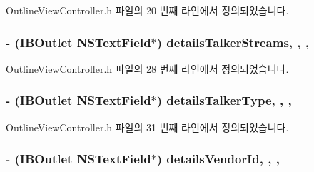 Outline\+View\+Controller.\+h 파일의 20 번째 라인에서 정의되었습니다.

\subsubsection[{\texorpdfstring{details\+Talker\+Streams}{detailsTalkerStreams}}]{\setlength{\rightskip}{0pt plus 5cm}-\/ (I\+B\+Outlet N\+S\+Text\+Field$\ast$) details\+Talker\+Streams\hspace{0.3cm}{\ttfamily [read]}, {\ttfamily [write]}, {\ttfamily [atomic]}, {\ttfamily [weak]}}\hypertarget{interface_outline_view_controller_a070a2c6cab3e46934349fe45fbf40926}{}\label{interface_outline_view_controller_a070a2c6cab3e46934349fe45fbf40926}


Outline\+View\+Controller.\+h 파일의 28 번째 라인에서 정의되었습니다.

\subsubsection[{\texorpdfstring{details\+Talker\+Type}{detailsTalkerType}}]{\setlength{\rightskip}{0pt plus 5cm}-\/ (I\+B\+Outlet N\+S\+Text\+Field$\ast$) details\+Talker\+Type\hspace{0.3cm}{\ttfamily [read]}, {\ttfamily [write]}, {\ttfamily [atomic]}, {\ttfamily [weak]}}\hypertarget{interface_outline_view_controller_a6d5dab8105a95f098a2e48ec855a6962}{}\label{interface_outline_view_controller_a6d5dab8105a95f098a2e48ec855a6962}


Outline\+View\+Controller.\+h 파일의 31 번째 라인에서 정의되었습니다.

\subsubsection[{\texorpdfstring{details\+Vendor\+Id}{detailsVendorId}}]{\setlength{\rightskip}{0pt plus 5cm}-\/ (I\+B\+Outlet N\+S\+Text\+Field$\ast$) details\+Vendor\+Id\hspace{0.3cm}{\ttfamily [read]}, {\ttfamily [write]}, {\ttfamily [atomic]}, {\ttfamily [weak]}}\hypertarget{interface_outline_view_controller_a05fc46c77c4ab0a7c0d67420f4a97fe4}{}\label{interface_outline_view_controller_a05fc46c77c4ab0a7c0d67420f4a97fe4}


